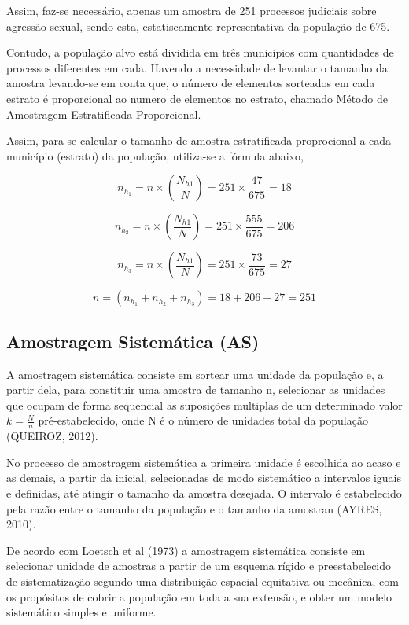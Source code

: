 Assim, faz-se necessário, apenas um amostra de 251 processos judiciais sobre
agressão sexual, sendo esta, estatiscamente representativa da população de 675.
\vskip0.3cm

Contudo, a população alvo está dividida em três municípios com quantidades
de processos diferentes em cada. Havendo a necessidade de levantar o tamanho da
amostra levando-se em conta que, o número de elementos sorteados em cada estrato
é proporcional ao numero de elementos no estrato, chamado Método de Amostragem
Estratificada Proporcional.
\vskip0.3cm

Assim, para se calcular o tamanho de amostra estratificada proprocional a cada
município (estrato) da população, utiliza-se a fórmula abaixo,


\newpage



$$
n_{h_{1}}= n \times  \left(\frac{N_{h1}}{N} \right)= 251 \times \frac{47}{675}= 18
$$

$$ 	n_{h_{2}}= n \times \left(\frac{N_{h1}}{N} \right)=251 \times \frac{555}{675}= 206 $$

$$ 	n_{h_{3}}= n \times \left(\frac{N_{h1}}{N} \right)= 251 \times \frac{73}{675}= 27 $$

$$ n = \left( n_{h_{1}} + n_{h_{2}} + n_{h_{3}}\right) = 18+206+27 = 251
$$




\subsection{Amostragem Sistemática (AS)}


A amostragem sistemática consiste em sortear uma unidade da população e, a partir dela, para constituir
uma amostra de tamanho n, selecionar as unidades que ocupam de forma sequencial as suposições multiplas
de um determinado valor $k=\frac{N}{n}$ pré-estabelecido, onde N é o número de unidades total da população (QUEIROZ, 2012).\vskip0.3cm

No processo de amostragem sistemática a primeira unidade é escolhida ao acaso e as demais, a partir da inicial, selecionadas de modo sistemático a intervalos iguais e definidas, até atingir o tamanho da amostra desejada. O intervalo é estabelecido pela razão entre o tamanho da população e o tamanho da amostran (AYRES, 2010).\vskip0.3cm

De acordo com Loetsch et al (1973) a amostragem sistemática consiste em selecionar unidade de amostras a partir
de um esquema rígido e preestabelecido de sistematização segundo uma distribuição espacial equitativa ou mecânica, com os propósitos de cobrir a população em toda a sua extensão, e obter um modelo sistemático simples e uniforme.\vskip0.3cm



